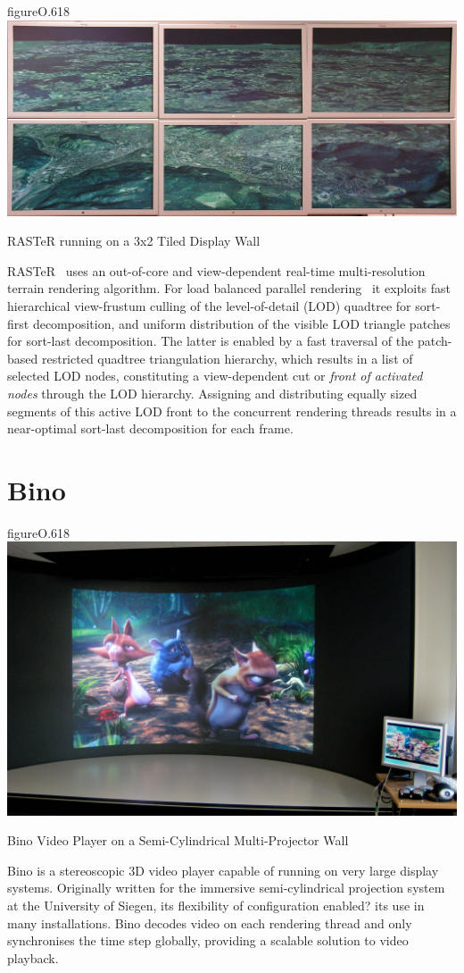 \begin{wrapfloat}{figure}{O}{.618\textwidth}
  \includegraphics[width=.618\textwidth]{images/raster}
  {\caption{\label{fRaster}RASTeR running on a 3x2 Tiled Display Wall}}
\end{wrapfloat}

RASTeR~\cite{BGP:09} uses an out-of-core and view-dependent real-time
multi-resolution terrain rendering algorithm. For load balanced parallel rendering~\cite{GMBP:10} it
exploits fast hierarchical view-frustum culling of the level-of-detail (LOD)
quadtree for sort-first decomposition, and uniform distribution of the visible
LOD triangle patches for sort-last decomposition. The latter is enabled by a
fast traversal of the patch-based restricted quadtree triangulation hierarchy,
which results in a list of selected LOD nodes, constituting a view-dependent cut
or \emph{front of activated nodes} through the LOD hierarchy. Assigning and
distributing equally sized segments of this active LOD front to the concurrent
rendering threads results in a near-optimal sort-last decomposition for each
frame.

\section{Bino}

\begin{wrapfloat}{figure}{O}{.618\textwidth}
  \includegraphics[width=.618\textwidth]{images/bino}
  {\caption{\label{fBino}Bino Video Player on a Semi-Cylindrical Multi-Projector Wall}}
\end{wrapfloat}

Bino is a stereoscopic 3D video player capable of running on very large display
systems. Originally written for the immersive semi-cylindrical projection
system at the University of Siegen, its flexibility of configuration enabled? its
use in many installations. Bino decodes video on each
rendering thread and only synchronises the time step globally, providing a
scalable solution to video playback.


